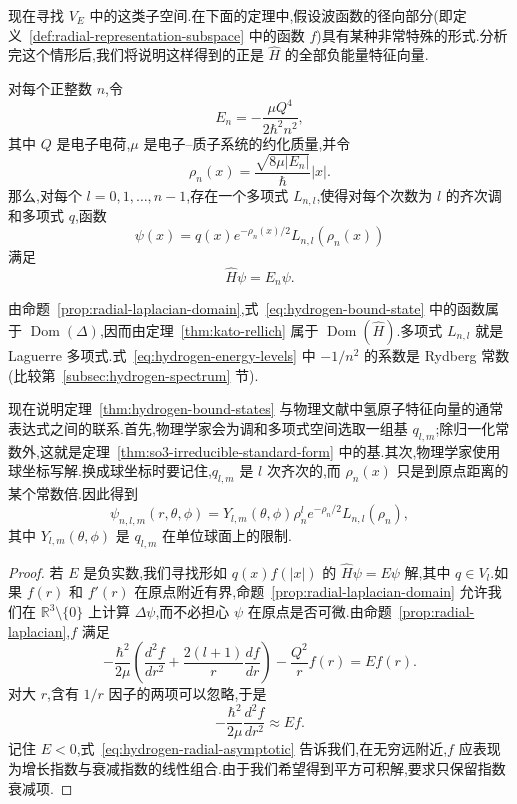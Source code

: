 {现在寻找 $V_E$ 中的这类子空间.在下面的定理中,假设波函数的径向部分(即定义~\ref{def:radial-representation-subspace} 中的函数 $f$)具有某种非常特殊的形式.分析完这个情形后,我们将说明这样得到的正是 $\widehat H$ 的全部负能量特征向量.

\begin{theorem}[氢原子的束缚态]\label{thm:hydrogen-bound-states}
对每个正整数 $n$,令
\[
 E_n=-\frac{\mu Q^4}{2\hbar^2n^2},
\label{eq:hydrogen-energy-levels}
\]
其中 $Q$ 是电子电荷,$\mu$ 是电子--质子系统的约化质量,并令
\[
 \rho_n(x)=\frac{\sqrt{8\mu|E_n|}}{\hbar}|x|.
\label{eq:hydrogen-rho}
\]
那么,对每个 $l=0,1,\ldots,n-1$,存在一个多项式 $L_{n,l}$,使得对每个次数为 $l$ 的齐次调和多项式 $q$,函数
\[
 \psi(x)=q(x)e^{-\rho_n(x)/2}L_{n,l}(\rho_n(x))
\label{eq:hydrogen-bound-state}
\]
满足
\[
 \widehat H\psi=E_n\psi.
\]
\end{theorem}

由命题~\ref{prop:radial-laplacian-domain},式~\eqref{eq:hydrogen-bound-state} 中的函数属于 $\operatorname{Dom}(\Delta)$,因而由定理~\ref{thm:kato-rellich} 属于 $\operatorname{Dom}(\widehat H)$.多项式 $L_{n,l}$ 就是 Laguerre 多项式.式~\eqref{eq:hydrogen-energy-levels} 中 $-1/n^2$ 的系数是 Rydberg 常数(比较第~\ref{subsec:hydrogen-spectrum} 节).

现在说明定理~\ref{thm:hydrogen-bound-states} 与物理文献中氢原子特征向量的通常表达式之间的联系.首先,物理学家会为调和多项式空间选取一组基 $q_{l,m}$;除归一化常数外,这就是定理~\ref{thm:so3-irreducible-standard-form} 中的基.其次,物理学家使用球坐标写解.换成球坐标时要记住,$q_{l,m}$ 是 $l$ 次齐次的,而 $\rho_n(x)$ 只是到原点距离的某个常数倍.因此得到
\[
 \psi_{n,l,m}(r,\theta,\phi)=Y_{l,m}(\theta,\phi)\rho_n^l e^{-\rho_n/2}L_{n,l}(\rho_n),
\label{eq:hydrogen-spherical-eigenfunction}
\]
其中 $Y_{l,m}(\theta,\phi)$ 是 $q_{l,m}$ 在单位球面上的限制.

\begin{proof}
若 $E$ 是负实数,我们寻找形如 $q(x)f(|x|)$ 的 $\widehat H\psi=E\psi$ 解,其中 $q\in V_l$.如果 $f(r)$ 和 $f'(r)$ 在原点附近有界,命题~\ref{prop:radial-laplacian-domain} 允许我们在 $\mathbb R^3\setminus\{0\}$ 上计算 $\Delta\psi$,而不必担心 $\psi$ 在原点是否可微.由命题~\ref{prop:radial-laplacian},$f$ 满足
\[
 -\frac{\hbar^2}{2\mu}\left(\frac{d^2f}{dr^2}+\frac{2(l+1)}r\frac{df}{dr}\right)-\frac{Q^2}{r}f(r)=Ef(r).
\label{eq:hydrogen-radial-equation}
\]
对大 $r$,含有 $1/r$ 因子的两项可以忽略,于是
\[
 -\frac{\hbar^2}{2\mu}\frac{d^2f}{dr^2}\approx Ef.
\label{eq:hydrogen-radial-asymptotic}
\]
记住 $E<0$,式~\eqref{eq:hydrogen-radial-asymptotic} 告诉我们,在无穷远附近,$f$ 应表现为增长指数与衰减指数的线性组合.由于我们希望得到平方可积解,要求只保留指数衰减项.


\end{proof}}
